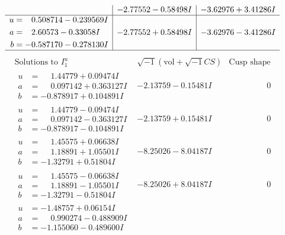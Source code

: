 \documentclass[1p]{elsarticle_modified}
\theoremstyle{definition}
\newcommand{\I}{\sqrt{-1}}
\begin{document}
$$\begin{array}{c|c|c}
 & -2.77552 - 0.58498 I & -3.62976 + 3.41286 I \\ \hline\begin{aligned}
u &= \phantom{-}0.508714 - 0.239569 I \\
a &= \phantom{-}2.60573 - 0.33058 I \\
b &= -0.587170 - 0.278130 I\end{aligned}
 & -2.77552 + 0.58498 I & -3.62976 - 3.41286 I\\
 \hline 
 \end{array}$$\newpage$$\begin{array}{c|c|c}  
\text{Solutions to }I^u_{1}& \I (\text{vol} + \sqrt{-1}CS) & \text{Cusp shape}\\
 \hline 
\begin{aligned}
u &= \phantom{-}1.44779 + 0.09474 I \\
a &= \phantom{-}0.097142 + 0.363127 I \\
b &= -0.878917 + 0.104891 I\end{aligned}
 & -2.13759 - 0.15481 I & \phantom{-0.000000 } 0 \\ \hline\begin{aligned}
u &= \phantom{-}1.44779 - 0.09474 I \\
a &= \phantom{-}0.097142 - 0.363127 I \\
b &= -0.878917 - 0.104891 I\end{aligned}
 & -2.13759 + 0.15481 I & \phantom{-0.000000 } 0 \\ \hline\begin{aligned}
u &= \phantom{-}1.45575 + 0.06638 I \\
a &= \phantom{-}1.18891 + 1.05501 I \\
b &= -1.32791 + 0.51804 I\end{aligned}
 & -8.25026 - 8.04187 I & \phantom{-0.000000 } 0 \\ \hline\begin{aligned}
u &= \phantom{-}1.45575 - 0.06638 I \\
a &= \phantom{-}1.18891 - 1.05501 I \\
b &= -1.32791 - 0.51804 I\end{aligned}
 & -8.25026 + 8.04187 I & \phantom{-0.000000 } 0 \\ \hline\begin{aligned}
u &= -1.48757 + 0.06154 I \\
a &= \phantom{-}0.990274 - 0.488909 I \\
b &= -1.155060 - 0.489600 I\end{aligned}

\end{array}$$
\end{document}
